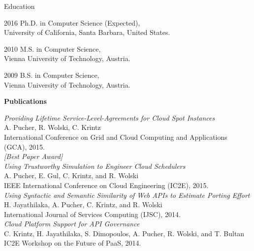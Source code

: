 \begin{vitae}

\begin{vitaesection}{Education}
\vspace{-0.1cm}
\item [2016]	Ph.D. in Computer Science (Expected), \\ University of California, Santa Barbara, United States.
\item [2010]	M.S. in Computer Science, \\ Vienna University of Technology, Austria.
\item [2009]	B.S. in Computer Science, \\ Vienna University of Technology, Austria.
\end{vitaesection}

\textbf{Publications}



\textit{Providing Lifetime Service-Level-Agreements for Cloud Spot Instances} \\
A. Pucher, R. Wolski, C. Krintz \\
International Conference on Grid and Cloud Computing and Applications (GCA), 2015. \\

\textit{[Best Paper Award]} \\
\textit{Using Trustworthy Simulation to Engineer Cloud Schedulers} \\
A. Pucher, E. Gul, C. Krintz, and R. Wolski \\
IEEE International Conference on Cloud Engineering (IC2E), 2015. \\

\textit{Using Syntactic and Semantic Similarity of Web APIs to Estimate Porting Effort} \\
H. Jayathilaka, A. Pucher, C. Krintz, and R. Wolski \\
International Journal of Services Computing (IJSC), 2014. \\

\textit{Cloud Platform Support for API Governance} \\
C. Krintz, H. Jayathilaka, S. Dimopoulos, A. Pucher, R. Wolski, and T. Bultan \\
IC2E Workshop on the Future of PaaS, 2014. \\


\end{vitae}
